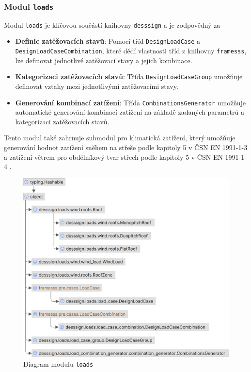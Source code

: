 \subsubsection*{Modul \texttt{loads}}
Modul \texttt{loads} je klíčovou součástí knihovny \texttt{desssign} a je zodpovědný za
\begin{itemize}
    \item \textbf{Definic zatěžovacích stavů}:  Pomocí tříd \texttt{DesignLoadCase} a \texttt{DesignLoadCaseCombination}, které dědí vlastnosti tříd z knihovny \texttt{framesss}, lze definovat jednotlivé zatěžovací stavy a jejich kombinace.
    \item \textbf{Kategorizaci zatěžovacích stavů}: Třída \texttt{DesignLoadCaseGroup} umožňuje definovat vztahy mezi jednotlivými zatěžovacími stavy.
    \item \textbf{Generování kombinací zatížení}: Třída \texttt{CombinationsGenerator} umožňuje automatické generování kombinací zatížení na základě zadaných parametrů a kategorizaci zatěžovacích stavů.
\end{itemize}

Tento modul také zahrnuje submodul pro klimatická zatížení, který umožňuje generování hodnot zatížení sněhem na střeše podle kapitoly 5 v ČSN EN 1991-1-3 \cite{EN1991_1_3} a zatížení větrem pro obdélníkový tvar střech podle kapitoly 5 v ČSN EN 1991-1-4 \cite{EN1991_1_4}.

\begin{figure}[H]
    \includegraphics{assets/figures/desssign/loads_uml.png}
    \caption{Diagram modulu \texttt{loads}}
    \label{fig:modul_loads}
\end{figure}

